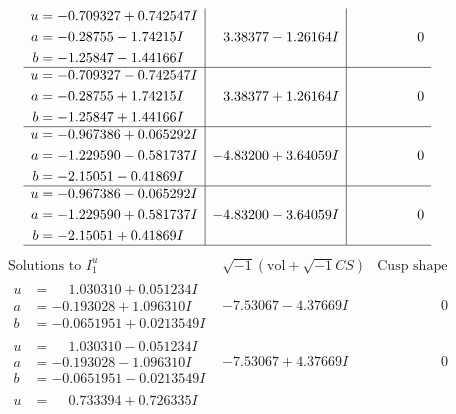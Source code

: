 \documentclass[1p]{elsarticle_modified}
\theoremstyle{definition}
\newcommand{\I}{\sqrt{-1}}
\begin{document}
$$\begin{array}{c|c|c}
\begin{aligned}
u &= -0.709327 + 0.742547 I \\
a &= -0.28755 - 1.74215 I \\
b &= -1.25847 - 1.44166 I\end{aligned}
 & \phantom{-}3.38377 - 1.26164 I & \phantom{-0.000000 } 0 \\ \hline\begin{aligned}
u &= -0.709327 - 0.742547 I \\
a &= -0.28755 + 1.74215 I \\
b &= -1.25847 + 1.44166 I\end{aligned}
 & \phantom{-}3.38377 + 1.26164 I & \phantom{-0.000000 } 0 \\ \hline\begin{aligned}
u &= -0.967386 + 0.065292 I \\
a &= -1.229590 - 0.581737 I \\
b &= -2.15051 - 0.41869 I\end{aligned}
 & -4.83200 + 3.64059 I & \phantom{-0.000000 } 0 \\ \hline\begin{aligned}
u &= -0.967386 - 0.065292 I \\
a &= -1.229590 + 0.581737 I \\
b &= -2.15051 + 0.41869 I\end{aligned}
 & -4.83200 - 3.64059 I & \phantom{-0.000000 } 0\\
 \hline 
 \end{array}$$\newpage$$\begin{array}{c|c|c}  
\text{Solutions to }I^u_{1}& \I (\text{vol} + \sqrt{-1}CS) & \text{Cusp shape}\\
 \hline 
\begin{aligned}
u &= \phantom{-}1.030310 + 0.051234 I \\
a &= -0.193028 + 1.096310 I \\
b &= -0.0651951 + 0.0213549 I\end{aligned}
 & -7.53067 - 4.37669 I & \phantom{-0.000000 } 0 \\ \hline\begin{aligned}
u &= \phantom{-}1.030310 - 0.051234 I \\
a &= -0.193028 - 1.096310 I \\
b &= -0.0651951 - 0.0213549 I\end{aligned}
 & -7.53067 + 4.37669 I & \phantom{-0.000000 } 0 \\ \hline\begin{aligned}
u &= \phantom{-}0.733394 + 0.726335 I \\

\end{aligned}
\end{array}$$
\end{document}
